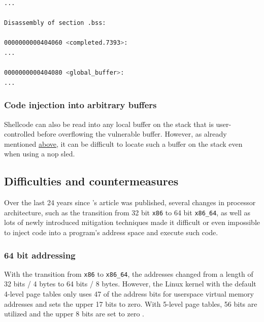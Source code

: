 \begin{lstlisting}[language=bash,float=ht,caption={Disassembly excerpt of the 64 bit binary compiled from the code in \cref{lst:local-global-buffer} with \texttt{gcc -o local-global-buffer local-global-buffer.c -no-pie}, retrieved with \texttt{objdump -D local-global-buffer}}, label={lst:local-global-buffer-disassembly}]
        ...

Disassembly of section .bss:

0000000000404060 <completed.7393>:
...

0000000000404080 <global_buffer>:
...
\end{lstlisting}

\subsubsection{Code injection into arbitrary buffers}
\label{subsubsec:ci-into-arbitrary-buffer}

Shellcode can also be read into any local buffer on the stack that is user-controlled before overflowing the vulnerable buffer.
However, as already mentioned \hyperref[subsubsec:ci-via-globals]{above}, it can be difficult to locate such a buffer on the stack even when using a \acrshort{nop} sled.

\subsection{Difficulties and countermeasures}
\label{subsec:ci-countermeasures}

Over the last 24 years since \citeauthor{AlephOne1996}'s article  was published, several changes in processor architecture, such as the transition from 32 bit \texttt{x86} to 64 bit \texttt{x86\_64}, as well as lots of newly introduced mitigation techniques made it difficult or even impossible to inject code into a program's address space and execute such code.

\subsubsection{64 bit addressing}
\label{subsubsec:ci-64bit-addressing}

With the transition from \texttt{x86} to \texttt{x86\_64}, the addresses changed from a length of 32 bits / 4 bytes to 64 bits / 8 bytes.
However, the Linux kernel with the default 4-level page tables only uses 47 of the address bits for userspace virtual memory addresses and sets the upper 17 bits to zero.
With 5-level page tables, 56 bits are utilized and the upper 8 bits are set to zero \cite{Kernel2020}.

